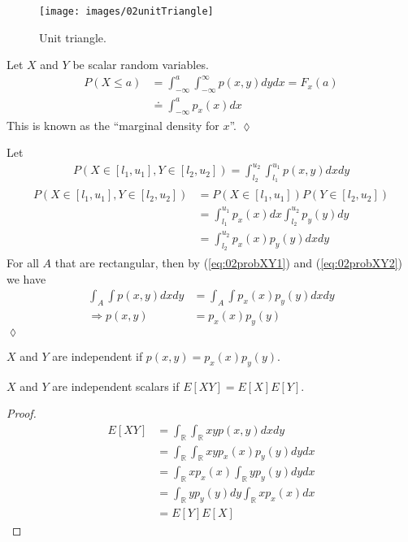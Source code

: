 \begin{figure}[ht!]
\centering
\texttt{[image: images/02unitTriangle]}
\caption{Unit triangle.}%
\label{fig:02unitTriangle}
\end{figure}

\begin{example}
Let $X$ and $Y$ be scalar random variables.
\begin{align*}
P(X\leq a) &= \int_{-\infty}^a \int_{-\infty}^\infty p(x,y)dydx = F_x(a) \\
&\doteq \int_{-\infty}^a p_x(x)dx
\end{align*}
This is known as the ``marginal density for $x$''.
$\lozenge$
\end{example}

\begin{example}
Let
\begin{align}
\label{eq:02probXY1}
P(X\in[l_1,u_1], Y\in[l_2,u_2]) = \int_{l_2}^{u_2} \int_{l_1}^{u_1} p(x,y)dxdy
\end{align}
\begin{align}
\label{eq:02probXY2}
\begin{split}
P(X\in[l_1,u_1], Y\in[l_2,u_2]) &= P(X\in[l_1,u_1]) P(Y\in[l_2,u_2]) \\
&= \int_{l_1}^{u_1}p_x(x)dx \int_{l_2}^{u_2}p_y(y)dy \\
&= \int_{l_2}^{u_2}p_x(x)p_y(y)dxdy
\end{split}
\end{align}
For all $A$ that are rectangular, then by (\ref{eq:02probXY1}) and (\ref{eq:02probXY2}) we have
\begin{align*}
\int_A\int p(x,y)dxdy &= \int_A\int p_x(x)p_y(y)dxdy \\
\Rightarrow p(x,y) &= p_x(x)p_y(y)
\end{align*}
$\lozenge$
\end{example}

\begin{theorem}
$X$ and $Y$ are independent if $p(x,y) = p_x(x)p_y(y)$.
\end{theorem}

\begin{theorem}
$X$ and $Y$ are independent scalars if $E[XY] = E[X]E[Y]$.
\end{theorem}

\begin{proof}
\begin{align*}
E[XY] &= \int_\mathbb{R}\int_\mathbb{R} xyp(x,y)dxdy \\
&= \int_\mathbb{R}\int_\mathbb{R} xyp_x(x)p_y(y)dydx \\
&= \int_\mathbb{R} xp_x(x)\int_\mathbb{R} yp_y(y)dydx \\
&= \int_\mathbb{R} yp_y(y)dy \int_\mathbb{R} xp_x(x)dx \\
&= E[Y]E[X]
\end{align*}
\end{proof}


